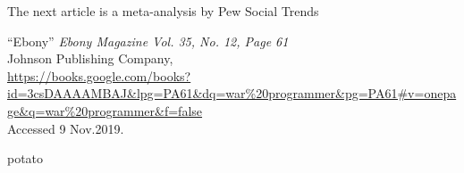 \documentclass[a4paper,12pt]{article}
\begin{document}
The next article\cite{pew} is a meta-analysis %
by Pew Social Trends


\newpage
\singlespacing

\begin{thebibliography}{9}

``Ebony'' \textit{Ebony Magazine Vol. 35, No. 12, Page 61}\\
Johnson Publishing Company, \\
\url{https://books.google.com/books?id=3csDAAAAMBAJ&lpg=PA61&dq=war%20programmer&pg=PA61#v=onepage&q=war%20programmer&f=false}  \\
Accessed 9 Nov.2019.

potato

\end{thebibliography}

\newpage

\end{document}
